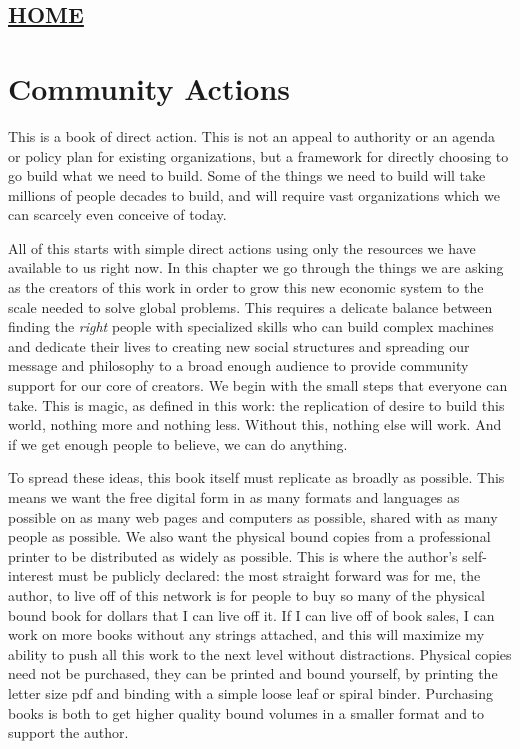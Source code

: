 \hypertarget{home}{%
\subsection{\texorpdfstring{\href{scrolls/home}{HOME}}{HOME}}\label{home}}

\hypertarget{community-actions}{%
\section{Community Actions}\label{community-actions}}

This is a book of direct action. This is not an appeal to authority or
an agenda or policy plan for existing organizations, but a framework for
directly choosing to go build what we need to build. Some of the things
we need to build will take millions of people decades to build, and will
require vast organizations which we can scarcely even conceive of today.

All of this starts with simple direct actions using only the resources
we have available to us right now. In this chapter we go through the
things we are asking as the creators of this work in order to grow this
new economic system to the scale needed to solve global problems. This
requires a delicate balance between finding the \emph{right} people with
specialized skills who can build complex machines and dedicate their
lives to creating new social structures and spreading our message and
philosophy to a broad enough audience to provide community support for
our core of creators. We begin with the small steps that everyone can
take. This is magic, as defined in this work: the replication of desire
to build this world, nothing more and nothing less. Without this,
nothing else will work. And if we get enough people to believe, we can
do anything.

To spread these ideas, this book itself must replicate as broadly as
possible. This means we want the free digital form in as many formats
and languages as possible on as many web pages and computers as
possible, shared with as many people as possible. We also want the
physical bound copies from a professional printer to be distributed as
widely as possible. This is where the author's self-interest must be
publicly declared: the most straight forward was for me, the author, to
live off of this network is for people to buy so many of the physical
bound book for dollars that I can live off it. If I can live off of book
sales, I can work on more books without any strings attached, and this
will maximize my ability to push all this work to the next level without
distractions. Physical copies need not be purchased, they can be printed
and bound yourself, by printing the letter size pdf and binding with a
simple loose leaf or spiral binder. Purchasing books is both to get
higher quality bound volumes in a smaller format and to support the
author.

